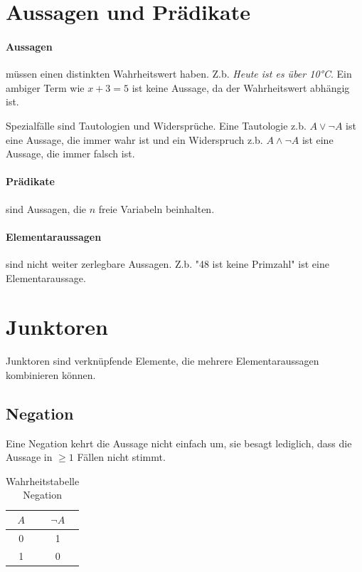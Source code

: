 \documentclass{article}
\author{Philipp Kiss}
\begin{document}
\tableofcontents

\newpage
\section{Aussagen und Prädikate}
\paragraph{Aussagen} müssen einen distinkten Wahrheitswert haben.
Z.b. \textit{Heute ist es über 10°C}. Ein ambiger Term wie \(x+3=5\) ist keine Aussage, da der Wahrheitswert abhängig ist.

Spezialfälle sind Tautologien und Widersprüche. Eine Tautologie z.b. \(A \vee \neg A\) ist eine Aussage, die immer wahr ist und ein Widerspruch z.b. \(A \wedge \neg A\) ist eine Aussage, die immer falsch ist.

\paragraph{Prädikate}
sind Aussagen, die \(n\) freie Variabeln beinhalten.

\paragraph{Elementaraussagen} sind nicht weiter zerlegbare Aussagen.
Z.b. "48 ist keine Primzahl" ist eine Elementaraussage.
\section{Junktoren}
Junktoren sind verknüpfende Elemente, die mehrere Elementaraussagen kombinieren können.
\subsection{Negation}
Eine Negation kehrt die Aussage nicht einfach um, sie besagt lediglich, dass die Aussage in \(\geq 1\) Fällen nicht stimmt.
\begin{table}[h!]
		\begin{center}
				\caption{Wahrheitstabelle Negation}
				\label{tab:}
				\begin{tabular}{c|c}
						\(A\) & \(\neg A\) \\
						\hline
						0 & 1\\
						1 & 0\\
				\end{tabular}
		\end{center}
\end{table}
\end{document}

